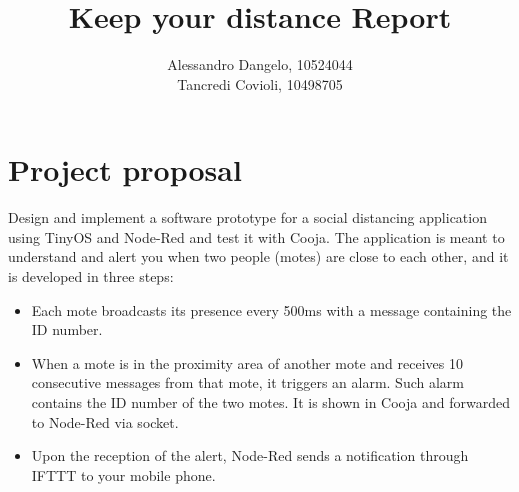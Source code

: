 \documentclass[11pt]{article}
\author{Alessandro Dangelo, 10524044 \\
Tancredi Covioli, 10498705}
\date{}
\title{Keep your distance Report}
\begin{document}
\maketitle

\section{Project proposal}
Design and implement a software prototype for a social distancing application using TinyOS and Node-Red and test it with Cooja. The application is meant to understand and alert you when two people (motes) are close to each other, and it is developed in three steps:

\begin{itemize}
  \item Each mote broadcasts its presence every 500ms with a message containing the ID number.
  \item When a mote is in the proximity area of another mote and receives 10 consecutive messages from that mote, it triggers an alarm. Such alarm contains the ID number of the two motes. It is shown in Cooja and forwarded to Node-Red via socket. 
  \item Upon the reception of the alert, Node-Red sends a notification through IFTTT to your mobile phone.
\end{itemize}
\end{document}
